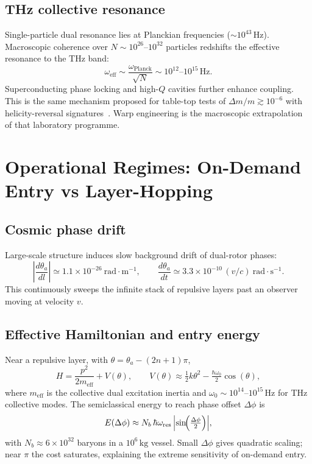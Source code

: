 \documentclass[dvipdfmx,a4paper]{article}
\theoremstyle{definition}
\begin{document}
\subsection{THz collective resonance}

Single-particle dual resonance lies at Planckian frequencies ($\sim 10^{43}\,\mathrm{Hz}$). Macroscopic coherence over $N\sim 10^{26}$--$10^{32}$ particles redshifts the effective resonance to the THz band:
\begin{equation}
\omega_{\mathrm{eff}} \sim \frac{\omega_{\mathrm{Planck}}}{\sqrt{N}} \sim 10^{12}\text{--}10^{15}\,\mathrm{Hz}.
\label{eq:freq-redshift}
\end{equation}
Superconducting phase locking and high-$Q$ cavities further enhance coupling. This is the same mechanism proposed for table-top tests of $\Delta m/m\gtrsim 10^{-6}$ with helicity-reversal signatures~\cite{dual2025}. Warp engineering is the macroscopic extrapolation of that laboratory programme.

\section{Operational Regimes: On-Demand Entry vs Layer-Hopping}
\label{sec:operational}

\subsection{Cosmic phase drift}

Large-scale structure induces slow background drift of dual-rotor phases:
\begin{equation}
\left|\frac{d\theta_a}{dl}\right| \simeq 1.1\times 10^{-26}~\mathrm{rad\cdot m^{-1}},
\qquad
\frac{d\theta_a}{dt} \simeq 3.3\times 10^{-10}\,(v/c)~\mathrm{rad\cdot s^{-1}}.
\label{eq:drift}
\end{equation}
This continuously sweeps the infinite stack of repulsive layers past an observer moving at velocity $v$.

\subsection{Effective Hamiltonian and entry energy}

Near a repulsive layer, with $\theta=\theta_a-(2n+1)\pi$,
\begin{equation}
H = \frac{p^2}{2m_{\mathrm{eff}}} + V(\theta),
\qquad
V(\theta) \approx \tfrac{1}{2}k\theta^2 - \tfrac{\hbar\omega_0}{2}\cos(\theta),
\label{eq:hamiltonian}
\end{equation}
where $m_{\mathrm{eff}}$ is the collective dual excitation inertia and $\omega_0\sim 10^{14}$--$10^{15}\,\mathrm{Hz}$ for THz collective modes. The semiclassical energy to reach phase offset $\Delta\phi$ is
\begin{equation}
E(\Delta\phi) \approx N_b\,\hbar\omega_{\mathrm{res}}\,\Bigl|\sin\!\Bigl(\tfrac{\Delta\phi}{2}\Bigr)\Bigr|,
\label{eq:energy}
\end{equation}
with $N_b\approx 6\times 10^{32}$ baryons in a $10^6\,\mathrm{kg}$ vessel. Small $\Delta\phi$ gives quadratic scaling; near $\pi$ the cost saturates, explaining the extreme sensitivity of on-demand entry.
\end{document}
